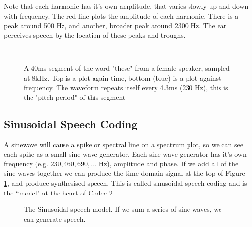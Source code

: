 \documentclass{article}
\begin{document}
Note that each harmonic has it's own amplitude, that varies slowly up and down with frequency.  The red line plots the amplitude of each harmonic. There is a peak around 500 Hz, and another, broader peak around 2300 Hz.  The ear perceives speech by the location of these peaks and troughs.

\begin{figure}[H]
\caption{ A 40ms segment of the word "these" from a female speaker, sampled at 8kHz. Top is a plot again time, bottom (blue) is a plot against frequency. The waveform repeats itself every 4.3ms (230 Hz), this is the "pitch period" of this segment.}
\label{fig:hts2a_time}
\begin{center}

\\

\end{center}
\end{figure}

\subsection{Sinusoidal Speech Coding}

A sinewave will cause a spike or spectral line on a spectrum plot, so we can see each spike as a small sine wave generator.  Each sine wave generator has it's own frequency (e.g. $230, 460, 690,...$ Hz), amplitude and phase.  If we add all of the sine waves together we can produce the time domain signal at the top of Figure \ref{fig:hts2a_time}, and produce synthesised speech.  This is called sinusoidal speech coding and is the ``model" at the heart of Codec 2.

\begin{figure}[h]
\caption{The Sinusoidal speech model.  If we sum a series of sine waves, we can generate speech.}
\label{fig:sinusoidal_model}
\begin{center}
\end{center}
\end{figure}
\end{document}

